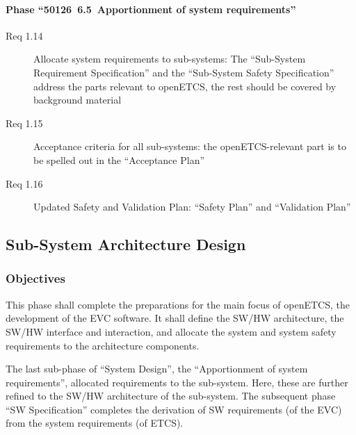 \documentclass{template/openetcs_article}
\begin{document}
\paragraph{Phase ``50126~6.5~Apportionment of system requirements''}

\begin{description}
\item[Req 1.14 {\cite[6.5.3.1]{EN50126:1999}}] Allocate system
  requirements to sub-systems: The ``Sub-System Requirement
  Specification'' and the ``Sub-System Safety Specification'' address
  the parts relevant to openETCS, the rest should be covered by
  background material
\item[Req 1.15 {\cite[6.5.3.2]{EN50126:1999}}] Acceptance criteria for
  all sub-systems: the openETCS-relevant part is to be spelled out in
  the ``Acceptance Plan''
\item[Req 1.16 {\cite[6.5.3.3]{EN50126:1999}}] Updated Safety and
  Validation Plan: ``Safety Plan'' and ``Validation Plan''
\end{description}







\subsection{Sub-System Architecture Design}
\label{sec:sub-system-AD}

\subsubsection{Objectives}
\label{sec:2-objectives}
This phase shall complete the preparations for the main focus of
openETCS, the development of the EVC software. It shall define the
SW/HW architecture, the SW/HW interface and interaction, and 
allocate the system and system safety requirements to the
architecture components.

The last sub-phase of ``System Design'', the ``Apportionment of system
requirements'', allocated requirements to the sub-system. Here, these
are further refined to the SW/HW architecture of the sub-system. The
subsequent phase ``SW Specification'' completes the derivation of SW
requirements (of the EVC) from the system requirements (of ETCS). 
\end{document}
